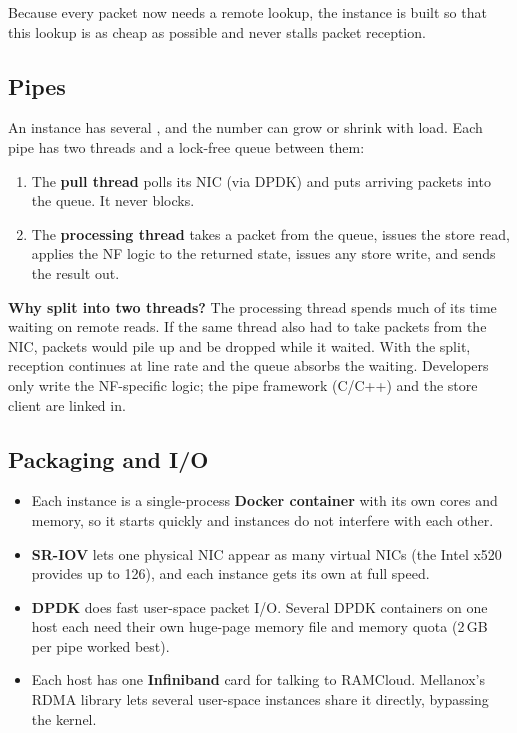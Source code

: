 
Because every packet now needs a remote lookup, the instance is built so that this lookup is as cheap as possible and never stalls packet
reception.

\subsection{Pipes}
An instance has several , and the number can grow or shrink with load. Each pipe has two threads and a lock-free queue between them:
\begin{enumerate}
  \item The \textbf{pull thread} polls its NIC (via DPDK) and puts arriving packets into the queue. It never blocks.
  \item The \textbf{processing thread} takes a packet from the queue, issues the store read, applies the NF logic to the returned state,
        issues any store write, and sends the result out.
\end{enumerate}
\textbf{Why split into two threads?} The processing thread spends much of its time waiting on remote reads. If the same thread also had to
take packets from the NIC, packets would pile up and be dropped while it waited. With the split, reception continues at line rate and the
queue absorbs the waiting. Developers only write the NF-specific logic; the pipe framework (C/C++) and the store client are linked in.

\subsection{Packaging and I/O}
\begin{itemize}
  \item Each instance is a single-process \textbf{Docker container} with its own cores and memory, so it starts quickly and instances do not interfere
        with each other.
  \item \textbf{SR-IOV} lets one physical NIC appear as many virtual NICs (the Intel x520 provides up to 126), and each instance gets its own at full speed.
  \item \textbf{DPDK} does fast user-space packet I/O. Several DPDK containers on one host each need their own huge-page memory file and memory quota
        (2\,GB per pipe worked best).
  \item Each host has one \textbf{Infiniband} card for talking to RAMCloud. Mellanox's RDMA library lets several user-space instances share it
        directly, bypassing the kernel.
\end{itemize}

